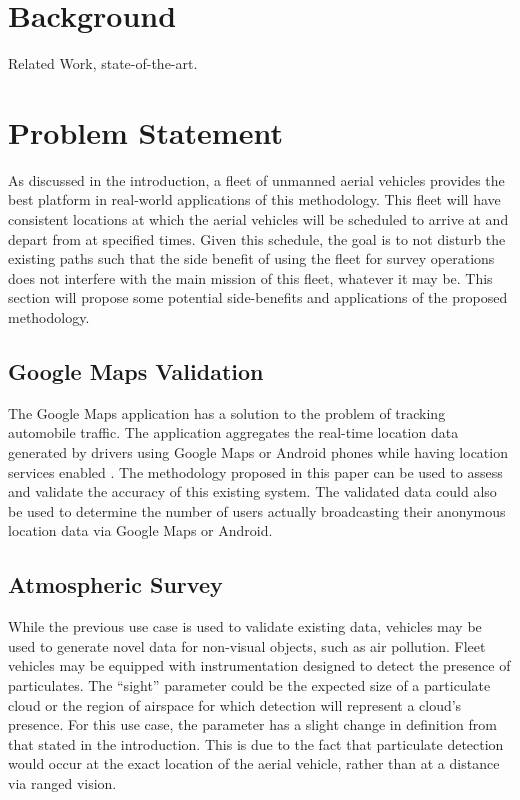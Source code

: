 \documentclass[conf]{new-aiaa}
\begin{document}
\section{Background}

Related Work, state-of-the-art.



\section{Problem Statement}

As discussed in the introduction, a fleet of unmanned aerial vehicles provides the best platform in real-world applications of this methodology. This fleet will have consistent locations at which the aerial vehicles will be scheduled to arrive at and depart from at specified times. Given this schedule, the goal is to not disturb the existing paths such that the side benefit of using the fleet for survey operations does not interfere with the main mission of this fleet, whatever it may be. This section will propose some potential side-benefits and applications of the proposed methodology.

\subsection{Google Maps Validation}
The Google Maps application has a solution to the problem of tracking automobile traffic. The application aggregates the real-time location data generated by drivers using Google Maps or Android phones while having location services enabled \cite{barth2009googlemaps}. The methodology proposed in this paper can be used to assess and validate the accuracy of this existing system. The validated data could also be used to determine the number of users actually broadcasting their anonymous location data via Google Maps or Android.

\subsection{Atmospheric Survey}
While the previous use case is used to validate existing data, vehicles may be used to generate novel data for non-visual objects, such as air pollution. Fleet vehicles may be equipped with instrumentation designed to detect the presence of particulates. The ``sight'' parameter could be the expected size of a particulate cloud or the region of airspace for which detection will represent a cloud's presence. For this use case, the parameter has a slight change in definition from that stated in the introduction. This is due to the fact that particulate detection would occur at the exact location of the aerial vehicle, rather than at a distance via ranged vision.
\end{document}
